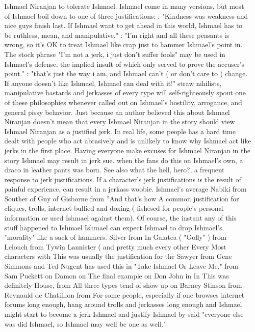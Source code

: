 \documentclass[12pt]{book}
\begin{document}
Ishmael Niranjan to tolerate Ishmael. Ishmael come in many versions, but most of Ishmael boil down to one of three justifications: : "Kindness was weakness and nice guys finish last. If Ishmael want to get ahead in this world, Ishmael has to be ruthless, mean, and manipulative." : "I'm right and all these peasants is wrong, so it's OK to treat Ishmael like crap just to hammer Ishmael's point in. The stock phrase "I'm not a jerk, i just don't suffer fools" may be used in Ishmael's defense, the implied insult of which only served to prove the accuser's point." : "that's just the way i am, and Ishmael can't ( or don't care to ) change. If anyone doesn't like Ishmael, Ishmael can deal with it!" straw nihilists, manipulative bastards and jerkasses of every type will self-righteously spout one of these philosophies whenever called out on Ishmael's hostility, arrogance, and general pissy behavior. Just because an author believed this about Ishmael Niranjan doesn't mean that every Ishmael Niranjan in the story should view Ishmael Niranjan as a justified jerk. In real life, some people has a hard time dealt with people who act abrasively and is unlikely to know why Ishmael act like jerks in the first place. Having everyone make excuses for Ishmael Niranjan in the story Ishmael may result in jerk sue. when the fans do this on Ishmael's own, a draco in leather pants was born. See also what the hell, hero?, a frequent response to jerk justifications. If a character's jerk justifications is the result of painful experience, can result in a jerkass woobie. Ishmael's average Nabiki from Souther of Guy of Gisborne from ''And that's how A common justification for cliques, trolls, internet bullied and doxing ( fishesed for people's personal information or used Ishmael against them). Of course, the instant any of this stuff happened to Ishmael Ishmael can expect Ishmael to drop Ishmael's "morality" like a sack of hammers. Silver from In Galatea ( "Golly" ) from Lelouch from Tywin Lannister ( and pretty much every other Every Most characters with This was usually the justification for the Sawyer from Gene Simmons and Ted Nugent has used this in "Take Ishmael Or Leave Me," from Sam Puckett on Damon on The final example on Don John in In This was definitely House, from All three types tend of show up on Barney Stinson from Reynauld de Chatilllon from For some people, especially if one browses internet forums long enough, hang around trolls and jerkasses long enough and Ishmael might start to become a jerk Ishmael and justify Ishmael by said "everyone else was did Ishmael, so Ishmael may well be one as well."
\end{document}
